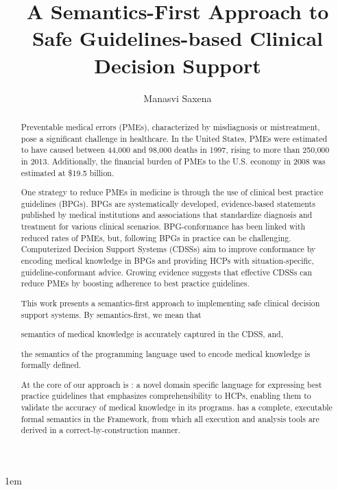 \documentclass[edeposit,tocnosub,noragright,centerchapter,fullpagesingle,12pt]{uiuc_csthesis21}
\title{A Semantics-First Approach to Safe Guidelines-based Clinical Decision Support}
\author{Manasvi Saxena}
\theoremstyle{definition}
\numberwithin{algocf}{chapter}     %
\begin{document}
%

%
\maketitle

\parindent 1em%

\frontmatter

%
\begin{abstract}
  Preventable medical errors (PMEs), characterized by misdiagnosis or mistreatment,
  pose a significant challenge in healthcare.
  In the United States, PMEs were estimated to have caused between
  44,000 and 98,000 deaths in 1997,
  rising to more than 250,000 in 2013. Additionally, the
  financial burden of PMEs to the U.S. economy in 2008 was estimated at \$19.5 billion.

  One strategy to reduce PMEs in medicine is through the use of
  clinical best practice guidelines (BPGs). BPGs are systematically developed,
  evidence-based statements published by medical institutions and associations
  that standardize diagnosis and treatment for various clinical scenarios.
  BPG-conformance has been linked with reduced rates of PMEs, but,
  following BPGs in practice can be challenging.
  Computerized Decision Support Systems (CDSSs) aim to improve conformance
  by encoding medical knowledge in BPGs and providing HCPs with
  situation-specific, guideline-conformant advice.
  Growing evidence suggests that
  effective CDSSs can reduce PMEs by boosting adherence to best practice guidelines.

  This work presents a semantics-first approach to implementing safe clinical
  decision support systems. By semantics-first,
  we mean that
  \begin{enumerate*}[label=\roman*]
    \item semantics of medical knowledge is
  accurately captured in the CDSS, and,
  \item the semantics of the programming language
    used to encode medical knowledge is formally defined.
  \end{enumerate*}
  At the core of our approach is \MediK{}: a novel domain specific language
  for expressing best practice guidelines that emphasizes comprehensibility
  to HCPs, enabling them to validate the accuracy of medical knowledge in its
  programs. \MediK{} has a complete, executable formal semantics in the \K{} Framework,
  from which all execution and analysis tools are derived in a
  correct-by-construction manner.


\end{abstract}
\end{document}
